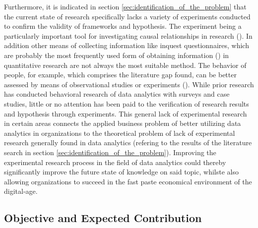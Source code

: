 Furthermore, it is indicated in section \ref{sec:identification_of_the_problem} that the current state of research specifically lacks a variety of experiments conducted to confirm the validity of frameworks and hypothesis. The experiment being a particularly important tool for investigating causal relationships in research (\cite{Gniewosz.2011}). In addition other means of collecting information like inquest questionnaires, which are probably the most frequently used form of obtaining information (\cite{Mummendey.2014}) in quantitative research are not always the most suitable method. The behavior of people, for example, which comprises the literature gap found, can be better assessed by means of observational studies or experiments (\cite{Gniewosz.2011}). While prior research has conducted behavioral research of data analytics with surveys and case studies, little or no attention has been paid to the verification of research results and hypothesis through experiments. This general lack of experimental research in certain areas connects the applied business problem of better utilizing data analytics in organizations to the theoretical problem of lack of experimental research generally found in data analytics (refering to the results of the literature search in section \ref{sec:identification_of_the_problem}). Improving the experimental research process in the field of data analytics could thereby significantly improve the future state of knowledge on said topic, whilste also allowing organizations to succeed in the fast paste economical environment of the digital-age.





\subsection{Objective and Expected Contribution}


